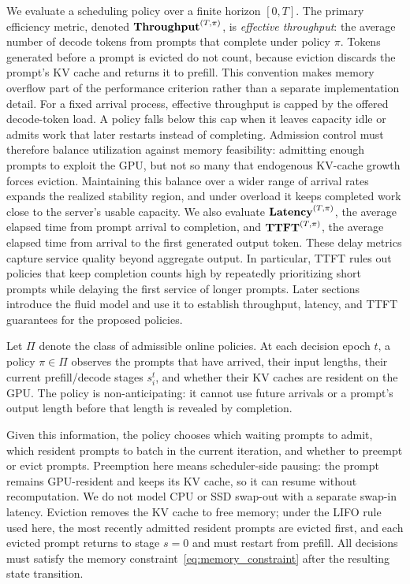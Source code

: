 We evaluate a scheduling policy over a finite horizon \([0,T]\). The primary efficiency metric, denoted \(\textbf{Throughput}^{(T,\pi)}\), is \textit{effective throughput}: the average number of decode tokens from prompts that complete under policy \(\pi\). Tokens generated before a prompt is evicted do not count, because eviction discards the prompt's KV cache and returns it to prefill. This convention makes memory overflow part of the performance criterion rather than a separate implementation detail. For a fixed arrival process, effective throughput is capped by the offered decode-token load. A policy falls below this cap when it leaves capacity idle or admits work that later restarts instead of completing. Admission control must therefore balance utilization against memory feasibility: admitting enough prompts to exploit the GPU, but not so many that endogenous KV-cache growth forces eviction. Maintaining this balance over a wider range of arrival rates expands the realized stability region, and under overload it keeps completed work close to the server's usable capacity. We also evaluate \(\textbf{Latency}^{(T,\pi)}\), the average elapsed time from prompt arrival to completion, and \(\textbf{TTFT}^{(T,\pi)}\), the average elapsed time from arrival to the first generated output token. These delay metrics capture service quality beyond aggregate output. In particular, TTFT rules out policies that keep completion counts high by repeatedly prioritizing short prompts while delaying the first service of longer prompts. Later sections introduce the fluid model and use it to establish throughput, latency, and TTFT guarantees for the proposed policies.

Let \(\Pi\) denote the class of admissible online policies. At each decision epoch \(t\), a policy \(\pi \in \Pi\) observes the prompts that have arrived, their input lengths, their current prefill/decode stages \(s_i^t\), and whether their KV caches are resident on the GPU. The policy is non-anticipating: it cannot use future arrivals or a prompt's output length before that length is revealed by completion.

Given this information, the policy chooses which waiting prompts to admit, which resident prompts to batch in the current iteration, and whether to preempt or evict prompts. Preemption here means scheduler-side pausing: the prompt remains GPU-resident and keeps its KV cache, so it can resume without recomputation. We do not model CPU or SSD swap-out with a separate swap-in latency. Eviction removes the KV cache to free memory; under the LIFO rule used here, the most recently admitted resident prompts are evicted first, and each evicted prompt returns to stage \(s=0\) and must restart from prefill. All decisions must satisfy the memory constraint~\eqref{eq:memory_constraint} after the resulting state transition.
